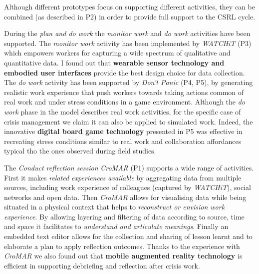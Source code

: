 Although different prototypes focus on supporting different activities, they can be combined (as described in P2) in order to provide full support to the CSRL cycle. 

During the \emph{plan and do work} the \emph{monitor work} and \emph{do work} activities have been supported. The \emph{monitor work} activity has been implemented by \emph{WATCHiT} (P3) which empowers workers for capturing a wide spectrum of qualitative and quantitative data. I found out that \textbf{wearable sensor technology and embodied user interfaces} provide the best design choice for data collection. The \emph{do work} activity has been supported by \emph{Don't Panic} (P4, P5), by generating realistic work experience that push workers towards taking actions common of real work and under stress conditions in a game environment. Although the \emph{do work} phase in the model describes real work activities, for the specific case of crisis management we claim it can also be applied to simulated work. Indeed, the innovative \textbf{digital board game technology} presented in P5 was effective in recreating stress conditions similar to real work and collaboration affordances typical tho the ones observed during field studies.

The \emph{Conduct reflection session} \emph{CroMAR} (P1) supports a wide range of activities. First it makes \emph{related experiences available} by aggregating data from multiple sources, including work experience of colleagues (captured by \emph{WATCHiT}), social networks and open data. Then \emph{CroMAR} allows for visualising data while being situated in a physical context that helps to \emph{reconstruct or envision work experience}. By allowing layering and filtering of data according to source, time and space it facilitates to \emph{understand and articulate meanings}. Finally an embedded text editor allows for the collection and sharing of lesson learnt and to elaborate a plan to apply reflection outcomes. Thanks to the experience with \emph{CroMAR} we also found out that \textbf{mobile augmented reality technology} is efficient in supporting debriefing and reflection after crisis work.

